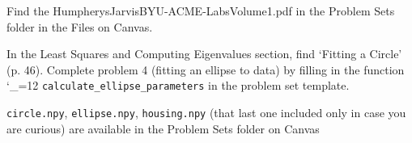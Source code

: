 \documentclass[12pt,letterpaper,noanswers]{exam}
\makeatletter
\newcommand{\pyf}{%
  \begingroup\catcode`_=12
  \pyf@
}
\newcommand{\pyf@}[1]{\texttt{#1}\endgroup}
\makeatother
\begin{document}
\begin{questions}
\begin{parts}
\end{parts}



\question Find the HumpherysJarvisBYU-ACME-LabsVolume1.pdf in the Problem Sets folder in the Files on Canvas.

In the Least Squares and Computing Eigenvalues section, find `Fitting a Circle' (p. 46).  Complete problem 4 (fitting an ellipse to data) by filling in the function \pyf{calculate_ellipse_parameters} in the problem set template.

\texttt{circle.npy}, \texttt{ellipse.npy}, \texttt{housing.npy} (that last one included only in case you are curious) are available in the Problem Sets folder on Canvas















\end{questions}
\end{document}
